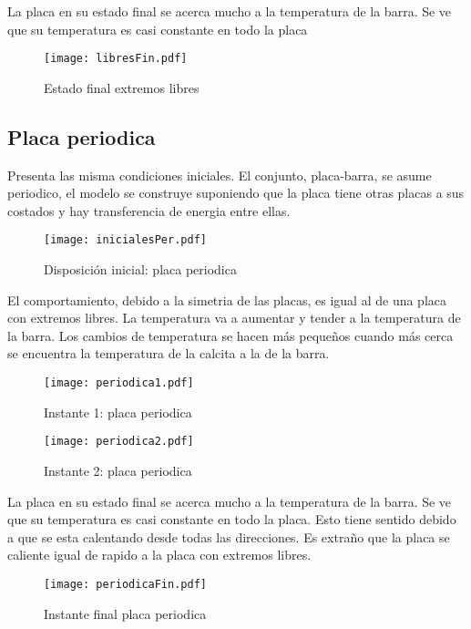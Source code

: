 \documentclass[12pt]{article}
\begin{document}
La placa en su estado final se acerca mucho a la temperatura de la barra. Se ve que su temperatura es casi constante en todo la placa

\begin{figure}[h!]
\centering
\texttt{[image: libresFin.pdf]}
\caption{Estado final extremos libres}
\label{Fig.}
\end{figure}

\subsection{Placa periodica}

Presenta las misma condiciones iniciales. El conjunto, placa-barra, se asume periodico, el modelo se construye suponiendo que la placa tiene otras placas a sus costados y hay transferencia de energia entre ellas.  

\begin{figure}[h!]
\centering
\texttt{[image: inicialesPer.pdf]}
\caption{Disposición inicial: placa periodica}
\label{Fig.}
\end{figure}

El comportamiento, debido a la simetria de las placas, es igual al de una placa con extremos libres. La temperatura va a aumentar y tender a la temperatura de la barra. Los cambios de temperatura se hacen más pequeños cuando más cerca se encuentra la temperatura de la calcita a la de la barra. 
\begin{figure}[h!]
\centering
\texttt{[image: periodica1.pdf]}
\caption{Instante 1: placa periodica}
\label{Fig.}
\end{figure}

\begin{figure}[h!]
\centering
\texttt{[image: periodica2.pdf]}
\caption{Instante 2: placa periodica}
\label{Fig.}
\end{figure}
La placa en su estado final se acerca mucho a la temperatura de la barra. Se ve que su temperatura es casi constante en todo la placa. Esto tiene sentido debido a que se esta calentando desde todas las direcciones. Es extraño que la placa se caliente igual de rapido a la placa con extremos libres.

\begin{figure}[h!]
\centering
\texttt{[image: periodicaFin.pdf]}
\caption{Instante final placa periodica}
\label{Fig.}
\end{figure}
\end{document}
